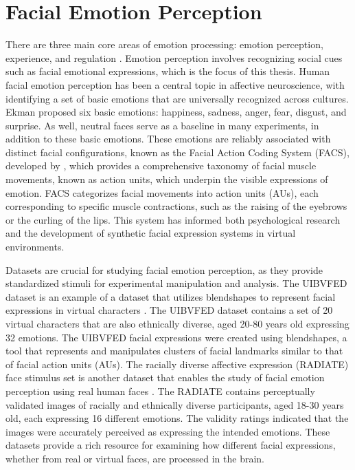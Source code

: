 \section{Facial Emotion Perception}
There are three main core areas of emotion processing: emotion perception, experience, and regulation \citep{westgarth_systematic_2021}. 
Emotion perception involves recognizing social cues such as facial emotional expressions, which is the focus of this thesis.
Human facial emotion perception has been a central topic in affective neuroscience, with \cite{ekman1971constants} identifying a set of basic emotions that are universally recognized across cultures. 
Ekman proposed six basic emotions: happiness, sadness, anger, fear, disgust, and surprise. 
As well, neutral faces serve as a baseline in many experiments, in addition to these basic emotions.
These emotions are reliably associated with distinct facial configurations, known as the Facial Action Coding System (FACS), developed by \cite{ekman1978facial}, which provides a comprehensive taxonomy of facial muscle movements, known as action units, which underpin the visible expressions of emotion. 
FACS categorizes facial movements into action units (AUs), each corresponding to specific muscle contractions, such as the raising of the eyebrows or the curling of the lips.
This system has informed both psychological research and the development of synthetic facial expression systems in virtual environments. 

Datasets are crucial for studying facial emotion perception, as they provide standardized stimuli for experimental manipulation and analysis.
The UIBVFED dataset is an example of a dataset that utilizes blendshapes to represent facial expressions in virtual characters \citep{oliver_uibvfed_2020}. 
The UIBVFED dataset contains a set of 20 virtual characters that are also ethnically diverse, aged 20-80 years old expressing 32 emotions. 
The UIBVFED facial expressions were created using blendshapes, a tool that represents and manipulates clusters of facial landmarks similar to that of facial action units (AUs).
The racially diverse affective expression (RADIATE) face stimulus set is another dataset that enables the study of facial emotion perception using real human faces \citep{conley_racially_2018}.
The RADIATE contains perceptually validated images of racially and ethnically diverse participants, aged 18-30 years old, each expressing 16 different emotions. 
The validity ratings indicated that the images were accurately perceived as expressing the intended emotions. 
These datasets provide a rich resource for examining how different facial expressions, whether from real or virtual faces, are processed in the brain.

